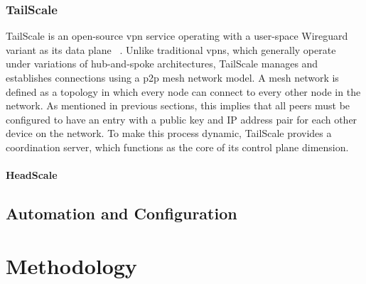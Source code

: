 \documentclass[11pt,twoside,a4paper]{report}
\begin{document}
\subsection{TailScale}

TailScale is an open-source \acrshort{vpn} service operating with a user-space Wireguard variant as its data plane ~\cite{tailscale2020online}. Unlike traditional \acrshort{vpn}s, which generally operate under variations of hub-and-spoke architectures, TailScale manages and establishes connections using a \acrshort{p2p} mesh network model. A mesh network is defined as a topology in which every node can connect to every other node in the network. As mentioned in previous sections, this implies that all peers must be configured to have an entry with a public key and IP address pair for each other device on the network. To make this process dynamic, TailScale provides a coordination server, which functions as the core of its control plane dimension.

\subsubsection{HeadScale}

\section{Automation and Configuration}


\chapter{Methodology}
\label{chapter:method}



%
%
\cleardoublepage
\iffalse
\else






\cleardoublepage
\end{document}
